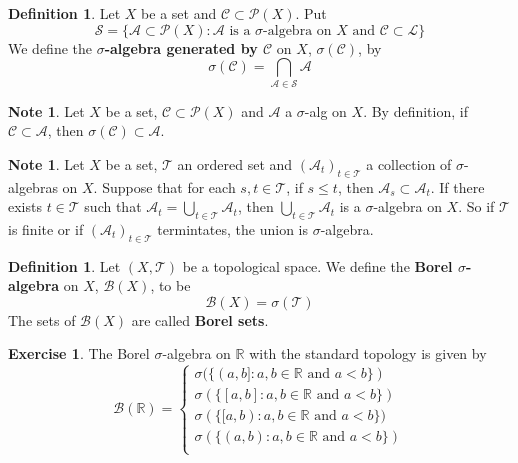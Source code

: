 \documentclass[12pt]{amsart}
\theoremstyle{definition}
\newtheorem{defn}[definition]{Definition}
\newtheorem{note}[definition]{Note}
\newtheorem{ex}[definition]{Exercise}
\newcommand{\sig}{\sigma}
\newcommand{\R}{\mathbb{R}}
\newcommand{\MA}{\mathcal{A}}
\newcommand{\MC}{\mathcal{C}}
\newcommand{\MB}{\mathcal{B}}
\newcommand{\ML}{\mathcal{L}}
\newcommand{\MS}{\mathcal{S}}
\newcommand{\MP}{\mathcal{P}}
\newcommand{\MT}{\mathcal{T}}
\newcommand{\lex}[1]{\label{ex:#1}}
\newcommand{\ld}[1]{\label{defn:#1}}
\begin{document}
	\begin{defn} \ld{00000} 
		Let $X$ be a set and $\MC \subset \MP(X)$. Put $$\MS = \{\MA \subset \MP(X): \MA \text{ is a }\sig\text{-algebra on }X \text{ and } \MC \subset \ML\}$$ We define the \textbf{$\sig$-algebra generated by $\MC$} on $X$, $\sig(\MC)$, by $$\sig(\MC) = \bigcap_{\MA \in \MS} \MA $$
	\end{defn}
	
	\begin{note}
		Let $X$ be a set, $\MC \subset \MP(X)$ and $\MA$ a $\sig$-alg on $X$. By definition, if $\MC \subset \MA$, then $\sig(\MC) \subset \MA$.
	\end{note}
	
	\begin{note}
		Let $X$ be a set, $\MT$ an ordered set and $(\MA_t)_{t\in \MT}$ a collection of $\sig$-algebras on $X$. Suppose that for each $s,t \in \MT$, if $s \leq t$, then $\MA_s \subset \MA_t$. If there exists $t \in \MT$ such that $\MA_t = \bigcup\limits_{t \in \MT}\MA_t$, then $\bigcup\limits_{t \in \MT}\MA_t$ is a $\sig$-algebra on $X$. So if $\MT$ is finite or if $(\MA_t)_{t \in \MT}$ termintates, the union is $\sig$-algebra.
	\end{note}
	
	\begin{defn} \ld{00000} 
		Let $(X,\MT)$ be a topological space. We define the \textbf{Borel $\sig$-algebra} on $X$, $\MB(X)$, to be  $$\MB(X) = \sig(\MT)$$ The sets of $\MB(X)$ are called \textbf{Borel sets}.
	\end{defn}
	
	\begin{ex} \lex{00000} 
		The Borel $\sigma$-algebra on $\R$ with the standard topology is given by 
		\[
		\MB(\R) =
		\begin{cases}
			\sig(\{(a,b]:a,b \in \R \text{ and } a<b\}) \\
			\sig(\{[a,b]:a,b \in \R \text{ and } a<b\}) \\
			\sig(\{[a,b):a,b \in \R \text{ and } a<b\}) \\
			\sig(\{(a,b):a,b \in \R \text{ and } a<b\}) \\
		\end{cases}
		\]
	\end{ex}
	
\end{document}
